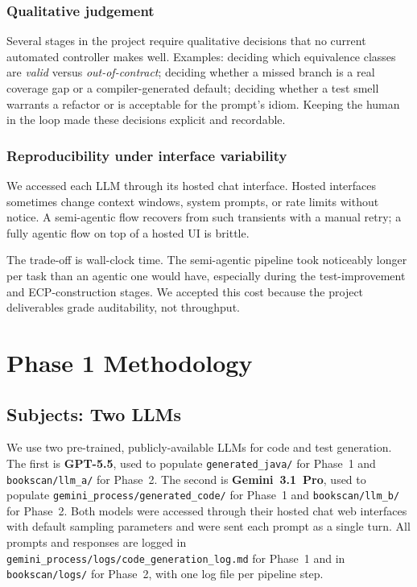 \documentclass[journal]{IEEEtran}
\begin{document}
\subsubsection*{Qualitative judgement}
Several stages in the project require qualitative decisions
that no current automated controller makes well. Examples:
deciding which equivalence classes are \emph{valid} versus
\emph{out-of-contract}; deciding whether a missed branch is a
real coverage gap or a compiler-generated default; deciding
whether a test smell warrants a refactor or is acceptable for
the prompt's idiom. Keeping the human in the loop made these
decisions explicit and recordable.

\subsubsection*{Reproducibility under interface variability}
We accessed each LLM through its hosted chat interface. Hosted
interfaces sometimes change context windows, system prompts,
or rate limits without notice. A semi-agentic flow recovers
from such transients with a manual retry; a fully agentic flow
on top of a hosted UI is brittle.

The trade-off is wall-clock time. The semi-agentic pipeline
took noticeably longer per task than an agentic one would
have, especially during the test-improvement and
ECP-construction stages. We accepted this cost because the
project deliverables grade auditability, not throughput.

\section{Phase 1 Methodology}
\label{sec:method}

\subsection{Subjects: Two LLMs}
We use two pre-trained, publicly-available LLMs for code and
test generation. The first is \textbf{GPT-5.5}, used to populate
\texttt{generated\_java/} for Phase~1 and \texttt{bookscan/llm\_a/}
for Phase~2. The second is \textbf{Gemini~3.1~Pro}, used to
populate \texttt{gemini\_process/generated\_code/} for Phase~1
and \texttt{bookscan/llm\_b/} for Phase~2. Both models were
accessed through their hosted chat web interfaces with default
sampling parameters and were sent each prompt as a single turn.
All prompts and responses are logged in
\texttt{gemini\_process/logs/code\_generation\_log.md} for
Phase~1 and in \texttt{bookscan/logs/} for Phase~2, with one
log file per pipeline step.
\end{document}
